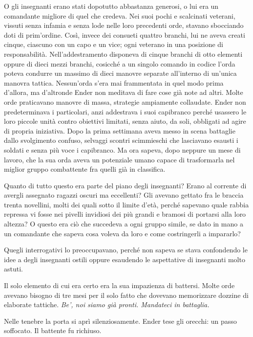 {O gli insegnanti erano stati dopotutto abbastanza generosi, o lui era
	un comandante migliore di quel che credeva. Nei suoi pochi e scalcinati
	veterani, vissuti senza infamia e senza lode nelle loro precedenti orde,
	stavano sbocciando doti di prim'ordine. Così, invece dei consueti
	quattro branchi, lui ne aveva creati cinque, ciascuno con un capo e un
	vice; ogni veterano in una posizione di responsabilità.
	Nell'addestramento disponeva di cinque branchi di otto elementi oppure
	di dieci mezzi branchi, cosicché a un singolo comando in codice l'orda
	poteva condurre un massimo di dieci manovre separate all'interno di
	un'unica manovra tattica. Nessun'orda s'era mai frammentata in quel modo
	prima d'allora, ma d'altronde Ender non meditava di fare cose già note
	ad altri. Molte orde praticavano manovre di massa, strategie ampiamente
	collaudate. Ender non predeterminava i particolari, anzi addestrava i
	suoi capibranco perché usassero le loro piccole unità contro obiettivi
	limitati, senza aiuto, da soli, obbligati ad agire di propria
	iniziativa. Dopo la prima settimana aveva messo in scena battaglie dallo
	svolgimento confuso, selvaggi scontri scimmieschi che lasciavano esausti
	i soldati e senza più voce i capibranco. Ma ora sapeva, dopo neppure un
	mese di lavoro, che la sua orda aveva un potenziale umano capace di
	trasformarla nel miglior gruppo combattente fra quelli già in
	classifica.}

{Quanto di tutto questo era parte del piano degli insegnanti? Erano al
	corrente di avergli assegnato ragazzi oscuri ma eccellenti? Gli avevano
	gettato fra le braccia trenta novellini, molti dei quali sotto il limite
	d'età, perché sapevano quale rabbia repressa vi fosse nei pivelli
	invidiosi dei più grandi e bramosi di portarsi alla loro altezza? O
	questo era ciò che succedeva a ogni gruppo simile, se dato in mano a un
	comandante che sapeva cosa voleva da loro e come costringerli a
	impararlo?}

{Quegli interrogativi lo preoccupavano, perché non sapeva se stava
	confondendo le idee a degli insegnanti ostili oppure esaudendo le
	aspettative di insegnanti molto astuti.}

{Il solo elemento di cui era certo era la sua impazienza di battersi.
	Molte orde avevano bisogno di tre mesi per il solo fatto che dovevano
	memorizzare dozzine di elaborate tattiche. \emph{Be', noi siamo già
		pronti. Mandateci in battaglia.}}

{Nelle tenebre la porta si aprì silenziosamente. Ender tese gli orecchi:
	un passo soffocato. Il battente fu richiuso.}

